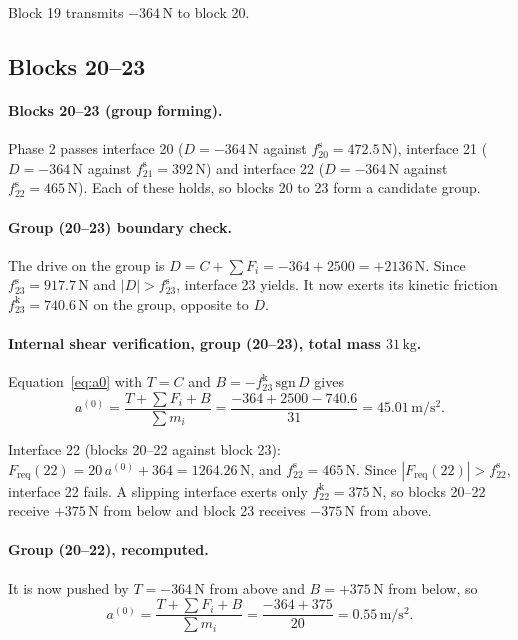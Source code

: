 \documentclass[11pt,a4paper]{article}
\begin{document}
Block 19 transmits $-364\,\mathrm{N}$ to block 20.

\subsection{Blocks 20--23}
\paragraph{Blocks 20--23 (group forming).} Phase 2 passes interface 20 ($D=-364\,\mathrm{N}$ against $f^{\mathrm s}_{20}=472.5\,\mathrm{N}$), interface 21 ($D=-364\,\mathrm{N}$ against $f^{\mathrm s}_{21}=392\,\mathrm{N}$) and interface 22 ($D=-364\,\mathrm{N}$ against $f^{\mathrm s}_{22}=465\,\mathrm{N}$). Each of these holds, so blocks 20 to 23 form a candidate group.

\paragraph{Group (20--23) boundary check.} The drive on the group is $D=C+\sum F_i=-364 + 2500=+2136\,\mathrm{N}$. Since $f^{\mathrm s}_{23}=917.7\,\mathrm{N}$ and $|D|>f^{\mathrm s}_{23}$, interface 23 yields. It now exerts its kinetic friction $f^{\mathrm k}_{23}=740.6\,\mathrm{N}$ on the group, opposite to $D$.

\paragraph{Internal shear verification, group (20--23), total mass $31\,\mathrm{kg}$.} Equation~\eqref{eq:a0} with $T=C$ and $B=-f^{\mathrm k}_{23}\,\mathrm{sgn}\,D$ gives\[a^{(0)}=\dfrac{T+\sum F_i+B}{\sum m_i}=\dfrac{-364 + 2500 - 740.6}{31}=45.01\,\mathrm{m/s^2}.\]

Interface 22 (blocks 20--22 against block 23): $F_{\mathrm{req}}(22)=20\,a^{(0)} + 364=1264.26\,\mathrm{N}$, and $f^{\mathrm s}_{22}=465\,\mathrm{N}$. Since $|F_{\mathrm{req}}(22)|>f^{\mathrm s}_{22}$, interface 22 fails. A slipping interface exerts only $f^{\mathrm k}_{22}=375\,\mathrm{N}$, so blocks 20--22 receive $+375\,\mathrm{N}$ from below and block 23 receives $-375\,\mathrm{N}$ from above.

\paragraph{Group (20--22), recomputed.} It is now pushed by $T=-364\,\mathrm{N}$ from above and $B=+375\,\mathrm{N}$ from below, so\[a^{(0)}=\dfrac{T+\sum F_i+B}{\sum m_i}=\dfrac{-364 + 375}{20}=0.55\,\mathrm{m/s^2}.\]
\end{document}
